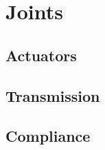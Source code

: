 \section{Joints} %
\label{sec:joints}

	\subsection{Actuators} %
	\label{sub:actuators}


	\subsection{Transmission} %
	\label{sub:transmission}


	\subsection{Compliance} %
	\label{sub:compliance}


